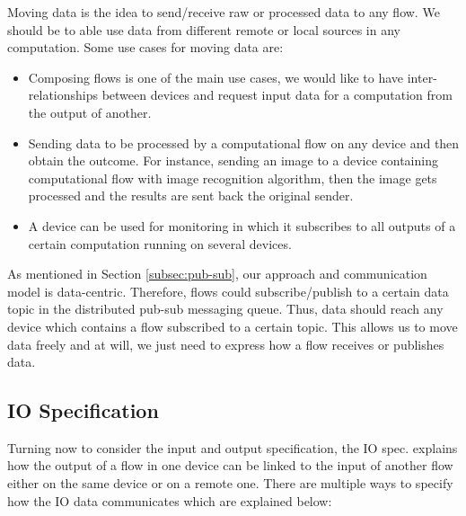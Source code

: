 Moving data is the idea  to send/receive raw or processed data to any flow. We should be to able use data from different remote or local sources in any computation. Some use cases for moving data are:
\begin{itemize}
\item Composing flows is one of the main use cases, we would like to have inter-relationships between devices and  request input data for a computation from the output of another.

\item Sending data to be processed by a computational flow on any device and then obtain the outcome. For instance, sending an image to a device containing computational flow with image recognition algorithm, then the image gets processed and the results are sent back the original sender. 

\item A device can be used for monitoring  in which it subscribes to all outputs of a certain computation running on several devices.

\end{itemize} 
 As mentioned in Section \ref{subsec:pub-sub}, our approach and communication model is data-centric. Therefore, flows could subscribe/publish to a certain data topic in the distributed pub-sub messaging queue. Thus, data should reach any device which contains a flow subscribed to a certain topic. This allows us to move data freely and at will, we just need to express how a flow receives or publishes data.

\subsection{IO Specification}
Turning now to consider the input and output specification, the IO spec. explains how the output of a flow in one device can be linked to the input of another flow either on the same device or on a remote one. There are multiple ways to specify how the IO data communicates which are explained below:


